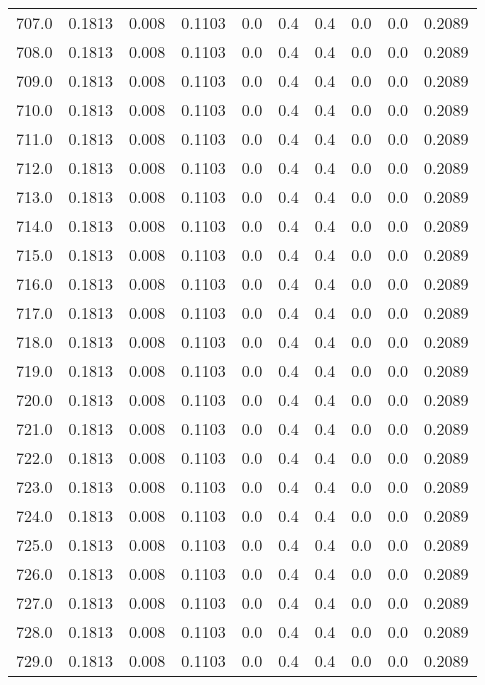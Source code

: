\begin{longtable}{lrrrrrrrrr}
707.0 & 0.1813 & 0.008 & 0.1103 & 0.0 & 0.4 & 0.4 & 0.0 & 0.0 & 0.2089 \\
708.0 & 0.1813 & 0.008 & 0.1103 & 0.0 & 0.4 & 0.4 & 0.0 & 0.0 & 0.2089 \\
709.0 & 0.1813 & 0.008 & 0.1103 & 0.0 & 0.4 & 0.4 & 0.0 & 0.0 & 0.2089 \\
710.0 & 0.1813 & 0.008 & 0.1103 & 0.0 & 0.4 & 0.4 & 0.0 & 0.0 & 0.2089 \\
711.0 & 0.1813 & 0.008 & 0.1103 & 0.0 & 0.4 & 0.4 & 0.0 & 0.0 & 0.2089 \\
712.0 & 0.1813 & 0.008 & 0.1103 & 0.0 & 0.4 & 0.4 & 0.0 & 0.0 & 0.2089 \\
713.0 & 0.1813 & 0.008 & 0.1103 & 0.0 & 0.4 & 0.4 & 0.0 & 0.0 & 0.2089 \\
714.0 & 0.1813 & 0.008 & 0.1103 & 0.0 & 0.4 & 0.4 & 0.0 & 0.0 & 0.2089 \\
715.0 & 0.1813 & 0.008 & 0.1103 & 0.0 & 0.4 & 0.4 & 0.0 & 0.0 & 0.2089 \\
716.0 & 0.1813 & 0.008 & 0.1103 & 0.0 & 0.4 & 0.4 & 0.0 & 0.0 & 0.2089 \\
717.0 & 0.1813 & 0.008 & 0.1103 & 0.0 & 0.4 & 0.4 & 0.0 & 0.0 & 0.2089 \\
718.0 & 0.1813 & 0.008 & 0.1103 & 0.0 & 0.4 & 0.4 & 0.0 & 0.0 & 0.2089 \\
719.0 & 0.1813 & 0.008 & 0.1103 & 0.0 & 0.4 & 0.4 & 0.0 & 0.0 & 0.2089 \\
720.0 & 0.1813 & 0.008 & 0.1103 & 0.0 & 0.4 & 0.4 & 0.0 & 0.0 & 0.2089 \\
721.0 & 0.1813 & 0.008 & 0.1103 & 0.0 & 0.4 & 0.4 & 0.0 & 0.0 & 0.2089 \\
722.0 & 0.1813 & 0.008 & 0.1103 & 0.0 & 0.4 & 0.4 & 0.0 & 0.0 & 0.2089 \\
723.0 & 0.1813 & 0.008 & 0.1103 & 0.0 & 0.4 & 0.4 & 0.0 & 0.0 & 0.2089 \\
724.0 & 0.1813 & 0.008 & 0.1103 & 0.0 & 0.4 & 0.4 & 0.0 & 0.0 & 0.2089 \\
725.0 & 0.1813 & 0.008 & 0.1103 & 0.0 & 0.4 & 0.4 & 0.0 & 0.0 & 0.2089 \\
726.0 & 0.1813 & 0.008 & 0.1103 & 0.0 & 0.4 & 0.4 & 0.0 & 0.0 & 0.2089 \\
727.0 & 0.1813 & 0.008 & 0.1103 & 0.0 & 0.4 & 0.4 & 0.0 & 0.0 & 0.2089 \\
728.0 & 0.1813 & 0.008 & 0.1103 & 0.0 & 0.4 & 0.4 & 0.0 & 0.0 & 0.2089 \\
729.0 & 0.1813 & 0.008 & 0.1103 & 0.0 & 0.4 & 0.4 & 0.0 & 0.0 & 0.2089 \\

\end{longtable}
